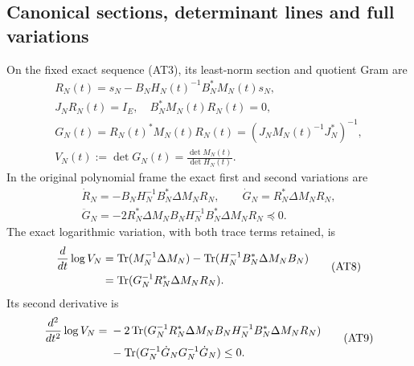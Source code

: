 \subsection{Canonical sections, determinant lines and full variations}

\begin{theorem}
On the fixed exact sequence (AT3), its least-norm section and quotient
Gram are
\[
 \begin{gathered}
 R_N(t)=s_N-B_NH_N(t)^{-1}B_N^*M_N(t)s_N,\\
 J_NR_N(t)=I_E,\quad B_N^*M_N(t)R_N(t)=0,\\
 G_N(t)=R_N(t)^*M_N(t)R_N(t)
       =(J_NM_N(t)^{-1}J_N^*)^{-1},\\
 V_N(t):=\det G_N(t)=\frac{\det M_N(t)}{\det H_N(t)}.
                                                        \end{gathered}
 \tag{AT6}
\]
In the original polynomial frame the exact first and second variations
are
\[
 \begin{gathered}
 \dot R_N=-B_NH_N^{-1}B_N^*\Delta M_NR_N,\qquad
 \dot G_N=R_N^*\Delta M_NR_N,\\
 \ddot G_N=-2R_N^*\Delta M_NB_NH_N^{-1}B_N^*\Delta M_NR_N
            \preceq0.                                \end{gathered}
 \tag{AT7}
\]
The exact logarithmic variation, with both trace terms retained, is
\[
 \begin{split}
 \frac{d}{dt}\log V_N
 &=\operatorname{Tr}(M_N^{-1}\Delta M_N)
   -\operatorname{Tr}(H_N^{-1}B_N^*\Delta M_NB_N)\\
 &=\operatorname{Tr}(G_N^{-1}R_N^*\Delta M_NR_N).             \end{split}
 \tag{AT8}
\]
Its second derivative is
\[
 \begin{split}
 \frac{d^2}{dt^2}\log V_N
 ={}&-2\operatorname{Tr}(G_N^{-1}R_N^*\Delta M_NB_NH_N^{-1}
                         B_N^*\Delta M_NR_N)\\
    &-\operatorname{Tr}(G_N^{-1}\dot G_NG_N^{-1}\dot G_N)\le0.
                                                        \end{split}
 \tag{AT9}
\]
\end{theorem}

